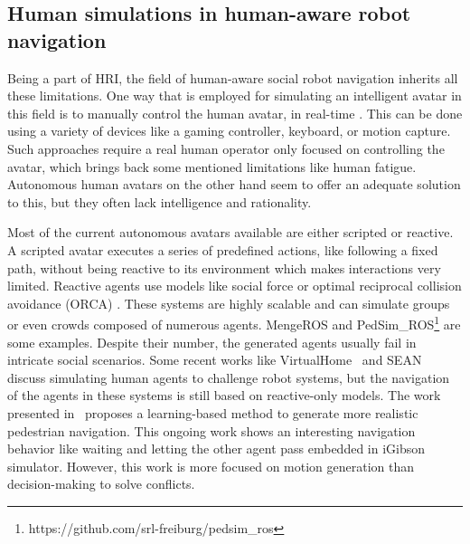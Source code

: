 \subsection{Human simulations in human-aware robot navigation}

Being a part of HRI, the field of human-aware social robot navigation inherits all these limitations. One way that is employed for simulating an intelligent avatar in this field is to manually control the human avatar, in real-time \cite{echeverria_simulating_2012}. 
This can be done using a variety of devices like a gaming controller, keyboard, or motion capture. Such approaches require a real human operator only focused on controlling the avatar, which brings back some mentioned limitations like human fatigue. Autonomous human avatars on the other hand seem to offer an adequate solution to this, but they often lack intelligence and rationality. 

Most of the current autonomous avatars available are either scripted or reactive. A scripted avatar executes a series of predefined actions, like following a fixed path, without being reactive to its environment which makes interactions very limited. Reactive agents use models like social force \cite{helbing1995social} or optimal reciprocal collision avoidance (ORCA) \cite{van2011reciprocal}. These systems are highly scalable and can simulate groups or even crowds composed of numerous agents. MengeROS \cite{aroor_mengeros_2018} and PedSim\_ROS\footnote{https://github.com/srl-freiburg/pedsim\_ros} are some examples. Despite their number, the generated agents usually fail in intricate social scenarios. Some recent works like VirtualHome~\cite{puig_virtualhome_2018} and SEAN~\cite{Tsoi_2020_HAI,tsoi2022sean} discuss simulating human agents to challenge robot systems, but the navigation of the agents in these systems is still based on reactive-only models. 
The work presented in~\cite{social_igibson} proposes a learning-based method to generate more realistic pedestrian navigation. This ongoing work shows an interesting navigation behavior like waiting and letting the other agent pass embedded in iGibson~\cite{shenigibson} simulator. However, this work is more focused on motion generation than decision-making to solve conflicts. 

